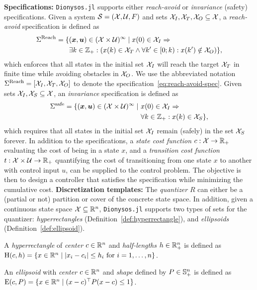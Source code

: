 \documentclass{juliacon}
\begin{document}
\vskip 6pt
\textbf{Specifications:}
\texttt{Dionysos.jl} supports either \emph{reach-avoid} or \emph{invariance} (safety) specifications. 
Given a system $\mathcal{S} = (\mathcal{X},\mathcal{U},F)$ and sets $\mathcal{X}_I, \mathcal{X}_T, \mathcal{X}_O \subseteq \mathcal{X}$, a \emph{reach-avoid} specification is defined as
\begin{align}
\Sigma^{\text{Reach}} = \{ &(\boldsymbol{x},\boldsymbol{u}) \in (\mathcal{X} \times \mathcal{U})^\infty \mid x(0) \in \mathcal{X}_I \Rightarrow \nonumber \\
&\exists k \in \mathbb{Z}_+ : \left(x(k) \in \mathcal{X}_T \land \forall k' \in [0;k):x(k')\notin \mathcal{X}_O\right) \}, \label{eq:reach-avoid-spec}
\end{align}
which enforces that all states in the initial set $\mathcal{X}_I$ will reach the target $\mathcal{X}_T$ in finite time while avoiding obstacles in $\mathcal{X}_O$. We use the abbreviated notation $\Sigma^{\text{Reach}}=[\mathcal{X}_I,\mathcal{X}_T,\mathcal{X}_O]$ to denote the specification~\eqref{eq:reach-avoid-spec}. 
Given sets $\mathcal{X}_I,\mathcal{X}_S\subseteq \mathcal{X}$, an \emph{invariance} specification is defined as
\begin{align}
    \Sigma^{\text{safe}} = \{(\boldsymbol{x},\boldsymbol{u})\in (\mathcal{X}\times \mathcal{U})^{\infty}\mid\ &x(0)\in \mathcal{X}_I \Rightarrow \nonumber \\
    &\forall k \in \mathbb{Z}_+: x(k)\in \mathcal{X}_S\}, \label{eq:invariance-spec} 
\end{align}
which requires that all states in the initial set $\mathcal{X}_I$ remain (safely) in the set $\mathcal{X}_S$ forever.
In addition to the specifications, a \emph{state cost function} $c:\mathcal{X}\rightarrow \mathbb{R}_+$ evaluating the cost of being in a state $x$, and a \emph{transition cost function} $t:\mathcal{X}\times \mathcal{U}\rightarrow \mathbb{R}_+$ quantifying the cost of transitioning from one state $x$ to another with control input $u$, can be supplied to the control problem. The objective is then to design a controller that satisfies the specification while minimizing the cumulative cost.
\vskip 6pt
\textbf{Discretization templates:} The \emph{quantizer} $R$ can either be a (partial or not) partition or cover of the concrete state space. In addition, given a continuous state space $\mathcal{X}\subseteq \mathbb{R}^n$, \texttt{Dionysos.jl} supports two types of sets for the quantizer: \color{red} \emph{hyperrectangles} (Definition~\ref{def:hyperrectangle}), and \emph{ellipsoids} (Definition~\ref{def:ellipsoid}).

\begin{defi} \label{def:hyperrectangle}
    A \emph{hyperrectangle} of \emph{center} $c\in\mathbb{R}^n$ and \emph{half-lengths} $h\in \mathbb{R}^n_{+}$ is defined as $\operatorname{H}(c,h) = \{x\in\mathbb{R}^n \mid |x_i-c_i|\le h_i \text{ for }i=1,\ldots,n\}$.
\end{defi}
\begin{defi} \label{def:ellipsoid}
    An \emph{ellipsoid} with \emph{center} $c\in\mathbb{R}^n$ and \emph{shape} defined by $P\in \mathbb{S}_{+}^{n}$ is defined as $\operatorname{E}(c,P) =  \{x\in\mathbb{R}^n\mid (x-c)^\top P(x-c) \le 1\}$.
\end{defi}
\color{black}
\end{document}
